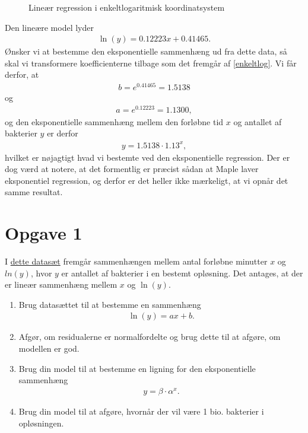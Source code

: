 \begin{exa}
\begin{figure}[H]
		\caption{Lineær regression i enkeltlogaritmisk koordinatsystem}
		\label{fig:linlogreg}
	\end{figure}
	Den lineære model lyder
	\begin{align*}
		\ln(y) = 0.12223x+0.41465.
	\end{align*}
	Ønsker vi at bestemme den eksponentielle sammenhæng ud fra dette data, så skal vi transformere koefficienterne tilbage som det fremgår af \eqref{enkeltlog}.
	Vi får derfor, at 
	\begin{align*}
		b = e^{0.41465} = 1.5138
	\end{align*}
	og
	\begin{align*}
		a = e^{0.12223} = 1.1300,
	\end{align*}
	og den eksponentielle sammenhæng mellem den forløbne tid $x$ og antallet af bakterier $y$ er derfor
	\begin{align*}
		y = 1.5138\cdot 1.13^x,
	\end{align*}
	hvilket er nøjagtigt hvad vi bestemte ved den eksponentielle regression. Der er dog værd at notere, at det formentlig er præcist sådan at Maple laver eksponentiel 
	regression, og derfor er det heller ikke mærkeligt, at vi opnår det samme resultat.
\end{exa}

\section*{Opgave 1}

I \href{https://github.com/ChristianJLex/TeachingNotes/raw/master/2022-2023/Data%20og%20lign/logBakterier.xlsx}{\color{blue!60}dette datasæt} fremgår sammenhængen mellem antal forløbne minutter $x$ og $ln(y)$, hvor $y$ er antallet af bakterier i en bestemt opløsning. 
Det antages, at der er lineær sammenhæng mellem $x$ og $\ln(y)$. 
\begin{enumerate}[label=\roman*)]
	\item Brug datasættet til at bestemme en sammenhæng 
	\begin{align*}
		\ln(y) = ax + b.
	\end{align*}
	\item Afgør, om residualerne er normalfordelte og brug dette til at afgøre, om modellen er god.
	\item Brug din model til at bestemme en ligning for den eksponentielle sammenhæng
	\begin{align*}
		y = \beta \cdot \alpha^x.
	\end{align*}
	\item Brug din model til at afgøre, hvornår der vil være 1 bio. bakterier i opløsningen. 
\end{enumerate}

